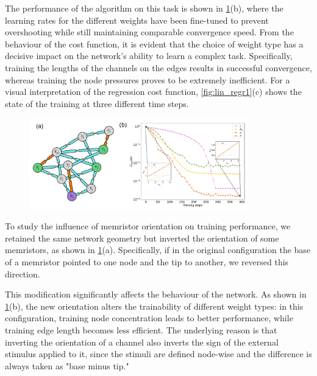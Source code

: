 \documentclass[reprint,superscriptaddress,prb,showkeys]{revtex4-2}
\begin{document}
The performance of the algorithm on this task is shown in \cref{fig:lin_regr2}(b), where the learning rates for the different weights have been fine-tuned to prevent overshooting while still maintaining comparable convergence speed. From the behaviour of the cost function, it is evident that the choice of weight type has a decisive impact on the network’s ability to learn a complex task. Specifically, training the lengths of the channels on the edges results in successful convergence, whereas training the node pressures proves to be extremely inefficient. For a visual interpretation of the regression cost function, \cref{fig:lin_regr1}(c) shows the state of the training at three different time steps.
\begin{figure}[t]
    \centering
    \includegraphics[width=0.85\textwidth]{plots/regression/regression_G00010002.pdf}
    \caption{}\label{fig:lin_regr2}
\end{figure} 

To study the influence of memristor orientation on training performance, we retained the same network geometry but inverted the orientation of some memristors, as shown in \cref{fig:lin_regr2}(a). Specifically, if in the original configuration the base of a memristor pointed to one node and the tip to another, we reversed this direction.

This modification significantly affects the behaviour of the network. As shown in \cref{fig:lin_regr2}(b), the new orientation alters the trainability of different weight types: in this configuration, training node concentration leads to better performance, while training edge length becomes less efficient. The underlying reason is that inverting the orientation of a channel also inverts the sign of the external stimulus applied to it, since the stimuli are defined node-wise and the difference is always taken as "base minus tip."
\end{document}
